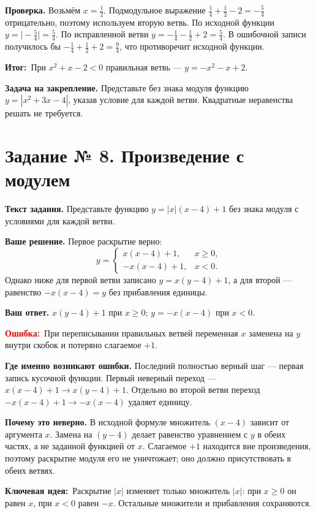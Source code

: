 \documentclass[12pt,a4paper]{article}
\newcommand{\err}{\textcolor{red}{\textbf{Ошибка:}}}
\newcommand{\idea}{\textcolor{blue!60!black}{\textbf{Ключевая идея:}}}
\newcommand{\outcome}{\textcolor{teal!60!black}{\textbf{Итог:}}}
\begin{document}
\textbf{Проверка.} Возьмём $x=\tfrac12$. Подмодульное выражение $\tfrac14+\tfrac12-2=-\tfrac54$ отрицательно, поэтому используем вторую ветвь. По исходной функции $y=\bigl|-\tfrac54\bigr|=\tfrac54$. По исправленной ветви $y=-\tfrac14-\tfrac12+2=\tfrac54$. В ошибочной записи получилось бы $-\tfrac14+\tfrac12+2=\tfrac94$, что противоречит исходной функции.

\outcome\ При $x^2+x-2<0$ правильная ветвь --- $y=-x^2-x+2$.

\textbf{Задача на закрепление.} Представьте без знака модуля функцию $y=|x^2+3x-4|$, указав условие для каждой ветви. Квадратные неравенства решать не требуется.

\clearpage
{}\label{task:8}
\section*{Задание № 8. Произведение с модулем}
\textbf{Текст задания.} Представьте функцию $y=|x|(x-4)+1$ без знака модуля с условиями для каждой ветви.

\textbf{Ваше решение.} Первое раскрытие верно:
\[
y=\begin{cases}x(x-4)+1,&x\geqslant0,\\-x(x-4)+1,&x<0.\end{cases}
\]
Однако ниже для первой ветви записано $y=x(y-4)+1$, а для второй --- равенство $-x(x-4)=y$ без прибавления единицы.

\textbf{Ваш ответ.} $x(y-4)+1$ при $x\geqslant0$; $y=-x(x-4)$ при $x<0$.

\err\ При переписывании правильных ветвей переменная $x$ заменена на $y$ внутри скобок и потеряно слагаемое $+1$.

\textbf{Где именно возникают ошибки.} Последний полностью верный шаг --- первая запись кусочной функции. Первый неверный переход --- $x(x-4)+1\longrightarrow x(y-4)+1$. Отдельно во второй ветви переход $-x(x-4)+1\longrightarrow -x(x-4)$ удаляет единицу.

\textbf{Почему это неверно.} В исходной формуле множитель $(x-4)$ зависит от аргумента $x$. Замена на $(y-4)$ делает равенство уравнением с $y$ в обеих частях, а не заданной функцией от $x$. Слагаемое $+1$ находится вне произведения, поэтому раскрытие модуля его не уничтожает; оно должно присутствовать в обеих ветвях.

\idea\ Раскрытие $|x|$ изменяет только множитель $|x|$: при $x\geqslant0$ он равен $x$, при $x<0$ равен $-x$. Остальные множители и прибавления сохраняются.
\end{document}
